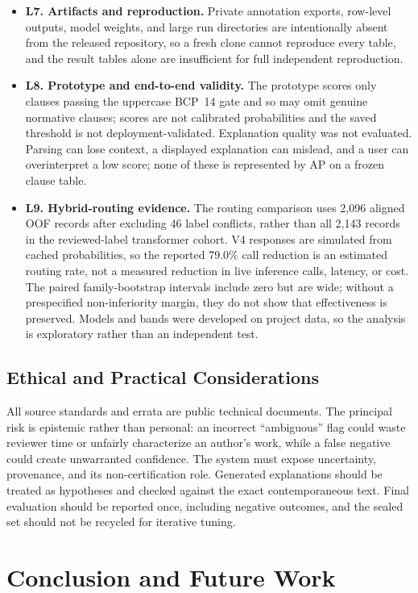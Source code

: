 \documentclass[12pt,a4paper,oneside]{report}
\begin{document}
\begin{itemize}[leftmargin=*]
  \item \textbf{L7. Artifacts and reproduction.} Private annotation exports, row-level outputs, model weights, and large run directories are intentionally absent from the released repository, so a fresh clone cannot reproduce every table, and the result tables alone are insufficient for full independent reproduction.
  \item \textbf{L8. Prototype and end-to-end validity.} The prototype scores only clauses passing the uppercase BCP~14 gate and so may omit genuine normative clauses; scores are not calibrated probabilities and the saved threshold is not deployment-validated. Explanation quality was not evaluated. Parsing can lose context, a displayed explanation can mislead, and a user can overinterpret a low score; none of these is represented by AP on a frozen clause table.
  \item \textbf{L9. Hybrid-routing evidence.} The routing comparison uses 2,096 aligned OOF records after excluding 46 label conflicts, rather than all 2,143 records in the reviewed-label transformer cohort. V4 responses are simulated from cached probabilities, so the reported 79.0\% call reduction is an estimated routing rate, not a measured reduction in live inference calls, latency, or cost. The paired family-bootstrap intervals include zero but are wide; without a prespecified non-inferiority margin, they do not show that effectiveness is preserved. Models and bands were developed on project data, so the analysis is exploratory rather than an independent test.
\end{itemize}

\section{Ethical and Practical Considerations}

All source standards and errata are public technical documents. The principal risk is epistemic rather than personal: an incorrect ``ambiguous'' flag could waste reviewer time or unfairly characterize an author's work, while a false negative could create unwarranted confidence. The system must expose uncertainty, provenance, and its non-certification role. Generated explanations should be treated as hypotheses and checked against the exact contemporaneous text. Final evaluation should be reported once, including negative outcomes, and the sealed set should not be recycled for iterative tuning.

\chapter{Conclusion and Future Work}
\end{document}
